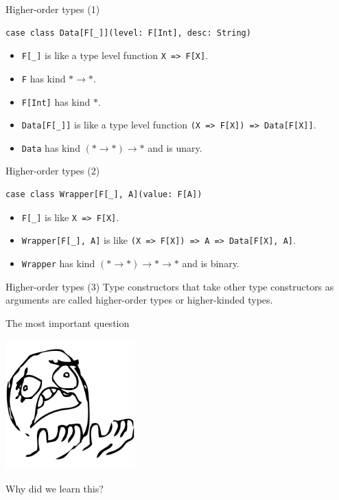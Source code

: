 \documentclass[presentation,aspectratio=169,smaller]{beamer}
\begin{document}
\begin{frame}[label={sec:org68cd0f6},fragile]{Higher-order types (1)}
 \begin{verbatim}
case class Data[F[_]](level: F[Int], desc: String)
\end{verbatim}

\begin{itemize}
\item <2-> \texttt{F[\_]} is like a type level function \texttt{X => F[X]}.
\item <3-> \texttt{F} has kind \(* \rightarrow *\).
\item <4-> \texttt{F[Int]} has kind \(*\).
\item <5-> \texttt{Data[F[\_]]} is like a type level function \texttt{(X => F[X]) => Data[F[X]]}.
\item <6-> \texttt{Data} has kind \((* \rightarrow *) \rightarrow *\) and is unary.
\end{itemize}
\end{frame}

\begin{frame}[label={sec:org09c456b},fragile]{Higher-order types (2)}
 \begin{verbatim}
case class Wrapper[F[_], A](value: F[A])
\end{verbatim}

\begin{itemize}
\item <2-> \texttt{F[\_]} is like \texttt{X => F[X]}.
\item <3-> \texttt{Wrapper[F[\_], A]} is like \texttt{(X => F[X]) => A => Data[F[X], A]}.
\item <4-> \texttt{Wrapper} has kind \((* \rightarrow *) \rightarrow * \rightarrow *\) and is binary.
\end{itemize}
\end{frame}

\begin{frame}[label={sec:org542bb7b}]{Higher-order types (3)}
Type constructors that take other type constructors as arguments are called
\alert{higher-order types} or \alert{higher-kinded types}.
\end{frame}

\begin{frame}[label={sec:org71d5384}]{The most important question}
\begin{center}
\includegraphics[height=5cm]{images/whyyy.png}
\end{center}

Why did we learn this?
\end{frame}
\end{document}
